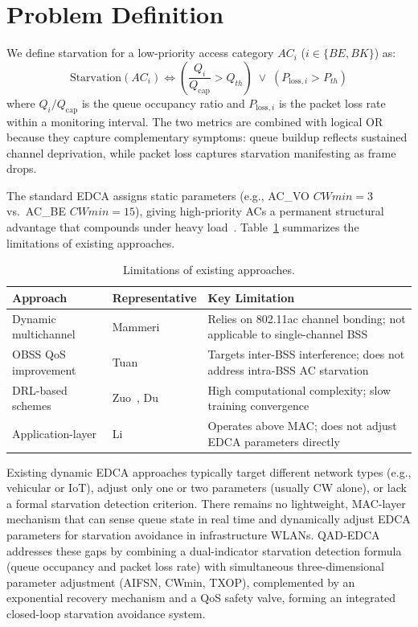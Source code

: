 \documentclass[12pt]{article}
\begin{document}
\section{Problem Definition}

We define starvation for a low-priority access category $AC_i$
($i \in \{BE, BK\}$) as:
\begin{equation}
  \text{Starvation}(AC_i) \iff
  \left( \frac{Q_i}{Q_{\text{cap}}} > Q_{th} \right)
  \;\lor\;
  \left( P_{\text{loss},i} > P_{th} \right)
\end{equation}
where $Q_i / Q_{\text{cap}}$ is the queue occupancy ratio and
$P_{\text{loss},i}$ is the packet loss rate within a monitoring
interval. The two metrics are combined with logical OR because
they capture complementary symptoms: queue buildup reflects
sustained channel deprivation, while packet loss captures
starvation manifesting as frame drops.

The standard EDCA assigns static parameters (e.g., AC\_VO
$CWmin = 3$ vs.\ AC\_BE $CWmin = 15$), giving high-priority
ACs a permanent structural advantage that compounds under heavy
load~\cite{ugwu2022}. Table~\ref{tab:limitations} summarizes
the limitations of existing approaches.

\begin{table}[H]
\centering
\caption{Limitations of existing approaches.}
\label{tab:limitations}
\small
\begin{tabularx}{\textwidth}{l l X}
\toprule
\textbf{Approach} & \textbf{Representative}
  & \textbf{Key Limitation} \\
\midrule
Dynamic multichannel
  & Mammeri~\cite{mammeri2021}
  & Relies on 802.11ac channel bonding; not applicable
    to single-channel BSS \\
OBSS QoS improvement
  & Tuan~\cite{tuan2023}
  & Targets inter-BSS interference; does not address
    intra-BSS AC starvation \\
DRL-based schemes
  & Zuo~\cite{zuo2025}, Du~\cite{du2024}
  & High computational complexity; slow training
    convergence \\
Application-layer
  & Li~\cite{li2024}
  & Operates above MAC; does not adjust EDCA
    parameters directly \\
\bottomrule
\end{tabularx}
\end{table}

Existing dynamic EDCA approaches typically target different
network types (e.g., vehicular or IoT), adjust only one or two
parameters (usually CW alone), or lack a formal starvation
detection criterion. There remains no lightweight, MAC-layer
mechanism that can sense queue state in real time and dynamically
adjust EDCA parameters for starvation avoidance in infrastructure
WLANs. QAD-EDCA addresses these gaps by combining a
dual-indicator starvation detection formula (queue occupancy and
packet loss rate) with simultaneous three-dimensional parameter
adjustment (AIFSN, CWmin, TXOP), complemented by an exponential
recovery mechanism and a QoS safety valve, forming an integrated
closed-loop starvation avoidance system.
\end{document}
